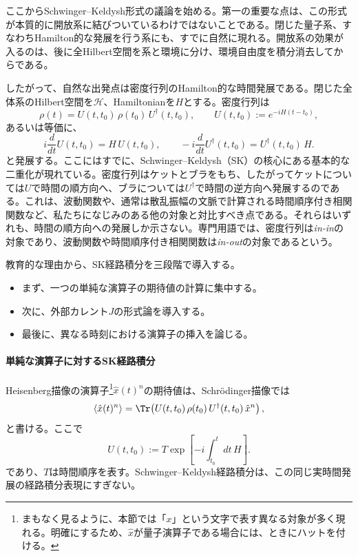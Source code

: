 \documentclass[a4paper,11pt,oneside]{article}
\theoremstyle{definition}
\numberwithin{equation}{section}
\begin{document}
ここからSchwinger--Keldysh形式の議論を始める。第一の重要な点は、この形式が本質的に開放系に結びついているわけではないことである。閉じた量子系、すなわちHamilton的な発展を行う系にも、すでに自然に現れる。開放系の効果が入るのは、後に全Hilbert空間を系と環境に分け、環境自由度を積分消去してからである。



したがって、自然な出発点は密度行列のHamilton的な時間発展である。閉じた全体系のHilbert空間を$\mathcal H$、Hamiltonianを$H$とする。密度行列は
\begin{equation}
\rho(t) = U(t,t_0)\,\rho(t_0)\,U^\dagger(t,t_0) ,
\qquad
U(t,t_0):=e^{-iH(t-t_0)} ,
\end{equation}
あるいは等価に、
\begin{equation}
i\frac{d}{dt}U(t,t_0)=H\,U(t,t_0) ,
\qquad
-i\frac{d}{dt}U^\dagger(t,t_0)=U^\dagger(t,t_0)\,H .
\end{equation}
と発展する。ここにはすでに、Schwinger--Keldysh（SK）の核心にある基本的な二重化が現れている。密度行列はケットとブラをもち、したがってケットについては$U$で時間の順方向へ、ブラについては$U^\dagger$で時間の逆方向へ発展するのである。これは、波動関数や、通常は散乱振幅の文脈で計算される時間順序付き相関関数など、私たちになじみのある他の対象と対比すべき点である。それらはいずれも、時間の順方向への発展しか示さない。専門用語では、密度行列は\textit{in-in}の対象であり、波動関数や時間順序付き相関関数は\textit{in-out}の対象であるという。



教育的な理由から、SK経路積分を三段階で導入する。
\begin{itemize}
\item まず、一つの単純な演算子の期待値の計算に集中する。
\item 次に、外部カレント$ J$の形式論を導入する。
\item 最後に、異なる時刻における演算子の挿入を論じる。
\end{itemize}





\paragraph{単純な演算子に対するSK経路積分} Heisenberg描像の演算子\footnote{まもなく見るように、本節では「$ x$」という文字で表す異なる対象が多く現れる。明確にするため、$ \hat x$が量子演算子である場合には、ときにハットを付ける。}$ \hat x(t)^{n}$の期待値は、Schr\"odinger描像では
\begin{equation}\label{Ooperator}
\langle \hat x(t)^{n} \rangle
=
\Tr\!\left(U(t,t_0)\,\rho(t_0)\,U^\dagger(t,t_0)\,\hat x^{n}\right) ,
\end{equation}
と書ける。ここで
\begin{equation}
U(t,t_0)
:=
T\exp\!\left[
-i\int_{t_0}^{t} dt\,H \right] .
\end{equation}
であり、$T$は時間順序を表す。Schwinger--Keldysh経路積分は、この同じ実時間発展の経路積分表現にすぎない。
\end{document}
